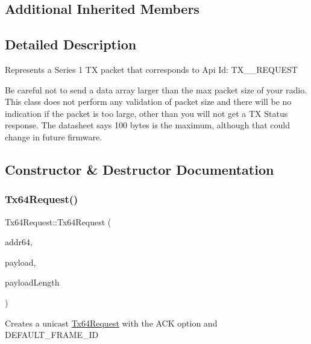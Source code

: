 \subsection*{Additional Inherited Members}


\subsection{Detailed Description}
Represents a Series 1 TX packet that corresponds to Api Id\+: T\+X\+\_\+\_\+\+R\+E\+Q\+U\+E\+ST

Be careful not to send a data array larger than the max packet size of your radio. This class does not perform any validation of packet size and there will be no indication if the packet is too large, other than you will not get a TX Status response. The datasheet says 100 bytes is the maximum, although that could change in future firmware. 

\subsection{Constructor \& Destructor Documentation}
\hypertarget{class_tx64_request_a7c9d830fa804daaf39ed368894cf9691}{}\label{class_tx64_request_a7c9d830fa804daaf39ed368894cf9691} 
\subsubsection{\texorpdfstring{Tx64\+Request()}{Tx64Request()}\hspace{0.1cm}{\footnotesize\ttfamily [1/2]}}
{\footnotesize\ttfamily Tx64\+Request\+::\+Tx64\+Request (\begin{DoxyParamCaption}\item[{\hyperlink{class_x_bee_address64}{X\+Bee\+Address64} \&}]{addr64,  }\item[{uint8\+\_\+t $\ast$}]{payload,  }\item[{uint8\+\_\+t}]{payload\+Length }\end{DoxyParamCaption})}

Creates a unicast \hyperlink{class_tx64_request}{Tx64\+Request} with the A\+CK option and D\+E\+F\+A\+U\+L\+T\+\_\+\+F\+R\+A\+M\+E\+\_\+\+ID \hypertarget{class_tx64_request_a49bd84b4aa5478c27e6da5581b2e1d3c}{}\label{class_tx64_request_a49bd84b4aa5478c27e6da5581b2e1d3c} 
